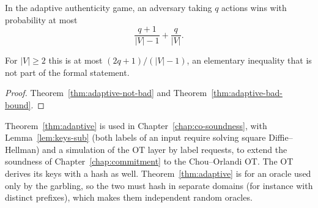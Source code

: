 \begin{theorem}
  \label{thm:adaptive}
  \leanok
  In the adaptive authenticity game, an adversary taking $q$ actions wins with probability at most
  \[ \frac{q + 1}{|V| - 1} + \frac{q}{|V|} . \]
\end{theorem}

For $|V| \geq 2$ this is at most $(2q + 1)/(|V| - 1)$, an elementary inequality that is not part of
the formal statement.

\begin{proof}
  \leanok
  Theorem~\ref{thm:adaptive-not-bad} and Theorem~\ref{thm:adaptive-bad-bound}.
\end{proof}

\begin{remark}
  \label{rem:adaptive-plan}
  Theorem~\ref{thm:adaptive} is used in Chapter~\ref{chap:co-soundness}, with
  Lemma~\ref{lem:keys-sub} (both labels of an input require solving square Diffie--Hellman) and a
  simulation of the OT layer by label requests, to extend the soundness of
  Chapter~\ref{chap:commitment} to the Chou--Orlandi OT. The OT derives its keys with a hash as
  well. Theorem~\ref{thm:adaptive} is for an oracle used only by the garbling, so the two must hash
  in separate domains (for instance with distinct prefixes), which makes them independent random
  oracles.
\end{remark}
